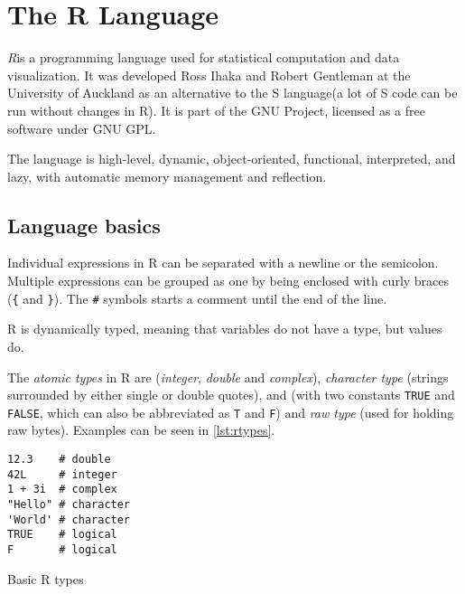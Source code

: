 \chapter{The R Language}

\begin{chapterabstract}
\end{chapterabstract}

\textit{R}\todocite is a programming language used for statistical computation and data visualization. It was developed Ross Ihaka and Robert Gentleman at the University of Auckland as an alternative to the S language\todocite (a lot of S code can be run without changes in R). It is part of the GNU Project, licensed as a free software under GNU GPL.

The language is high-level, dynamic, object-oriented, functional, interpreted, and lazy, with automatic memory management and reflection.

\section{Language basics}


Individual expressions in R can be separated with a newline or the semicolon. Multiple expressions can be grouped as one by being enclosed with curly braces (\texttt{\{} and \texttt{\}}). The \texttt{#} symbols starts a comment until the end of the line.

R is dynamically typed, meaning that variables do not have a type, but values do.

The \textit{atomic types} in R are  (\textit{integer}, \textit{double} and \textit{complex}), \textit{character type} (strings surrounded by either single or double quotes), and  (with two constants \texttt{TRUE} and \texttt{FALSE}, which can also be abbreviated as \texttt{T} and \texttt{F}) and \textit{raw type} (used for holding raw bytes). Examples can be seen in \ref{lst:rtypes}.


\begin{listing}[ht!]
	\centering
	\begin{verbatim}
12.3    # double
42L     # integer
1 + 3i  # complex
"Hello" # character
'World' # character
TRUE    # logical
F       # logical
    \end{verbatim}
	\caption{Basic R types}\label{lst:rtypes}
\end{listing}

